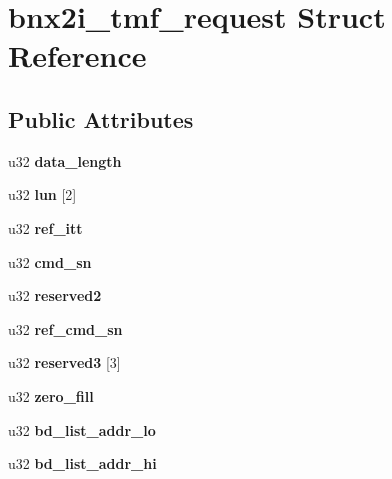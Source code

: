 \hypertarget{structbnx2i__tmf__request}{
\section{bnx2i\_\-tmf\_\-request Struct Reference}
\label{structbnx2i__tmf__request}
}
\subsection*{Public Attributes}
\begin{DoxyCompactItemize}
\item 
\hypertarget{structbnx2i__tmf__request_a48ec0418490d1aae383c089eb2e70790}{
u32 {\bfseries data\_\-length}}
\label{structbnx2i__tmf__request_a48ec0418490d1aae383c089eb2e70790}

\item 
\hypertarget{structbnx2i__tmf__request_a1ca7ed91a44703f9154c18f6708c3911}{
u32 {\bfseries lun} \mbox{[}2\mbox{]}}
\label{structbnx2i__tmf__request_a1ca7ed91a44703f9154c18f6708c3911}

\item 
\hypertarget{structbnx2i__tmf__request_ac0e841b5967339d84556a6b63aa1dff9}{
u32 {\bfseries ref\_\-itt}}
\label{structbnx2i__tmf__request_ac0e841b5967339d84556a6b63aa1dff9}

\item 
\hypertarget{structbnx2i__tmf__request_a6ae67abd7e8ce7fa6f0d06a93acc9259}{
u32 {\bfseries cmd\_\-sn}}
\label{structbnx2i__tmf__request_a6ae67abd7e8ce7fa6f0d06a93acc9259}

\item 
\hypertarget{structbnx2i__tmf__request_adb5514d3069c3ae6f6b64d6c747ff15a}{
u32 {\bfseries reserved2}}
\label{structbnx2i__tmf__request_adb5514d3069c3ae6f6b64d6c747ff15a}

\item 
\hypertarget{structbnx2i__tmf__request_a261b02bf071971a1e45b126ab129377a}{
u32 {\bfseries ref\_\-cmd\_\-sn}}
\label{structbnx2i__tmf__request_a261b02bf071971a1e45b126ab129377a}

\item 
\hypertarget{structbnx2i__tmf__request_aba2889418b1dc659552f3944af300c8e}{
u32 {\bfseries reserved3} \mbox{[}3\mbox{]}}
\label{structbnx2i__tmf__request_aba2889418b1dc659552f3944af300c8e}

\item 
\hypertarget{structbnx2i__tmf__request_a3cc3f1def67ca9355c4b81e12267259c}{
u32 {\bfseries zero\_\-fill}}
\label{structbnx2i__tmf__request_a3cc3f1def67ca9355c4b81e12267259c}

\item 
\hypertarget{structbnx2i__tmf__request_a75c9ece05f3559c548fc5f62688ecd36}{
u32 {\bfseries bd\_\-list\_\-addr\_\-lo}}
\label{structbnx2i__tmf__request_a75c9ece05f3559c548fc5f62688ecd36}

\item 
\hypertarget{structbnx2i__tmf__request_a4435108af79db53d7f6b71ba79eda2f0}{
u32 {\bfseries bd\_\-list\_\-addr\_\-hi}}
\label{structbnx2i__tmf__request_a4435108af79db53d7f6b71ba79eda2f0}

\end{DoxyCompactItemize}


